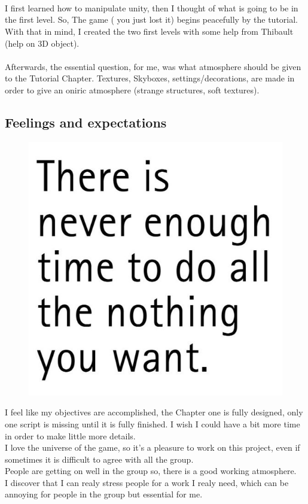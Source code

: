 			\\\\\\
			I first learned how to manipulate unity, then I thought of what is going to be in the first level.
			So, The game ( you just lost it) begins peacefully by the tutorial. With that in mind,
			I created the two first levels with some help from Thibault (help on 3D object).
			\\\\
			Afterwards, the essential question, for me, was what atmosphere should be given to the Tutorial Chapter.
			Textures, Skyboxes, settings/decorations, are made in order to give an oniric atmosphere (strange structures, soft textures).

		\subsection{Feelings and expectations}
			\begin{figure}
				\includegraphics[scale=0.2]{img_aym2.jpg}
			\end{figure}
			I feel like my objectives are accomplished, the Chapter one is fully designed, only one script is missing until it is fully finished.
			I wish I could have a bit more time in order to make little more details.
			\\
			I love the universe of the game, so it’s a pleasure to work on this project,
			even if sometimes it is difficult to agree with all the group.
			\\
			People are getting on well in the group so, there is a good working atmosphere.
			\\
			I discover that I can realy stress people for a work I realy need, which can be annoying for people in the group but essential for me.

